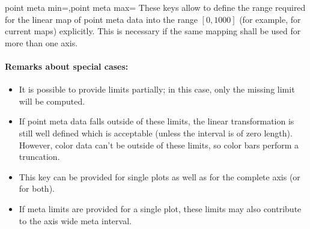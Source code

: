 \begin{pgfplotskeylist}{point meta min=,point meta max=}
	These keys allow to define the range required for the linear map of point meta data into the range $[0,1000]$ (for example, for current maps) explicitly. This is necessary if the same mapping shall be used for more than one axis.

	\paragraph{Remarks about special cases:}
	\begin{itemize}
		\item It is possible to provide limits partially; in this case, only the missing limit will be computed.
		\item If point meta data falls outside of these limits, the linear transformation is still well defined which is acceptable (unless the interval is of zero length). However, color data can't be outside of these limits, so color bars perform a truncation.
		\item This key can be provided for single plots as well as for the complete axis (or for both).
		\item If meta limits are provided for a single plot, these limits may also contribute to the axis wide meta interval.
	\end{itemize}
\end{pgfplotskeylist}

